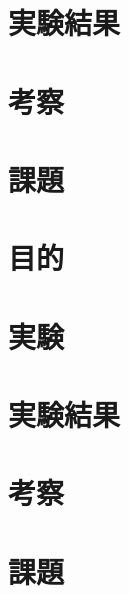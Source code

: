 \documentclass[uplatex, 11pt,a4j, titlepage]{jsarticle}
\begin{document}
\section{実験結果}
\section{考察}
\section{課題}


\newpage
\resetcounters



\subtitle{2019/*/*}

\section{目的}
\section{実験}
\section{実験結果}
\section{考察}
\section{課題}


\newpage
\thispagestyle{empty}
\nocite{key1}
\nocite{key2}


\end{document}

